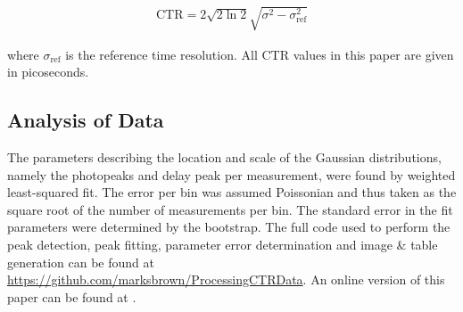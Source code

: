 \begin{align}
\text{CTR} = 2\sqrt{2\ln{2}}\sqrt{\sigma^2-\sigma_\textrm{ref}^2}
\end{align}

where $\sigma_\text{ref}$ is the reference time resolution. All CTR values in this paper are given in picoseconds.

\subsection{Analysis of Data}
The parameters describing the location and scale of the Gaussian distributions, namely the photopeaks and delay peak per measurement, were found by weighted least-squared fit. The error per bin was assumed Poissonian and thus taken as the square root of the number of measurements per bin. The standard error in the fit parameters were determined by the bootstrap\cite{degroot2012probability}. The full code used to perform the peak detection, peak fitting, parameter error determination and image \& table generation can be found at \href{https://github.com/marksbrown/ProcessingCTRData}{https://github.com/marksbrown/ProcessingCTRData}. An online version of this paper can be found at \cite{Brown2014}.